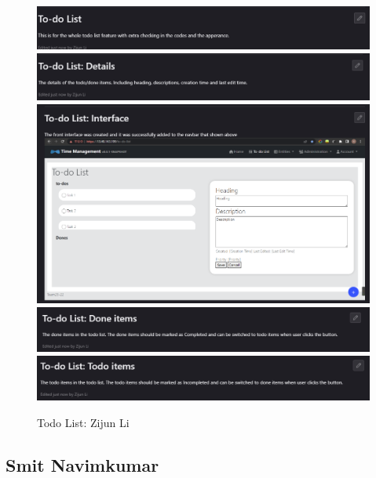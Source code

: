 \documentclass[a4paper]{article}
\begin{document}
\begin{figure}[H]
	\centering
	\includegraphics[width=1\textwidth]{./images/Todo_List.png}
	\includegraphics[width=1\textwidth]{./images/Todo_List_Details.png}
	\includegraphics[width=1\textwidth]{./images/Todo_List_Interface.png}
	\includegraphics[width=1\textwidth]{./images/Todo_List_Done_Item.png}
	\includegraphics[width=1\textwidth]{./images/Todo_List_Todo_Item.png}
	\caption*{Todo List: Zijun Li}
	\label{Fig.Todo List}
\end{figure}

\subsection{Smit Navimkumar}
\end{document}
